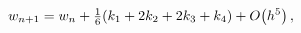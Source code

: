 \[w_{n+1}=w_{n}+\tfrac{1}{6}(k_{1}+2k_{2}+2k_{3}+k_{4})+\mathop{O\/}\nolimits\!%
\left(h^{5}\right),\]